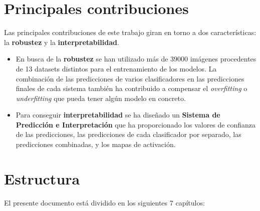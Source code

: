 \documentclass[
  12pt,
  spanish,
  a4paperpaper,
]{report}
\begin{document}
\hypertarget{principales-contribuciones}{%
\section{Principales contribuciones}\label{principales-contribuciones}}

Las principales contribuciones de este trabajo giran en torno a dos
características: la \textbf{robustez} y la \textbf{interpretabilidad}.

\begin{itemize}
\item
  En busca de la \textbf{robustez} se han utilizado más de 39000
  imágenes procedentes de 13 datasets distintos para el entrenamiento de
  los modelos. La combinación de las predicciones de varios
  clasificadores en las predicciones finales de cada sistema también ha
  contribuido a compensar el \emph{overfitting} o \emph{underfitting}
  que pueda tener algún modelo en concreto.
\item
  Para conseguir \textbf{interpretabilidad} se ha diseñado un
  \textbf{Sistema de Predicción e Interpretación} que ha proporcionado
  los valores de confianza de las predicciones, las predicciones de cada
  clasificador por separado, las predicciones combinadas, y los mapas de
  activación.
\end{itemize}

\hypertarget{estructura}{%
\section{Estructura}\label{estructura}}

El presente documento está dividido en los siguientes 7 capítulos:
\end{document}
